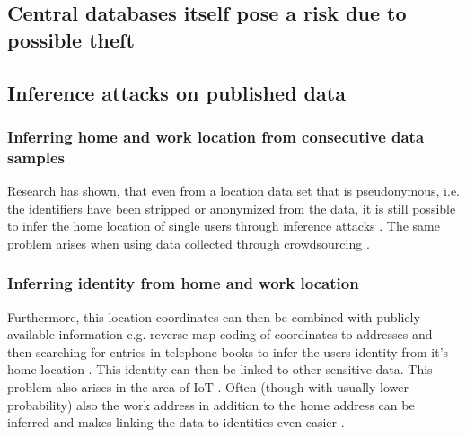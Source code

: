\subsection{Central databases itself pose a risk due to possible theft}


\subsection{Inference attacks on published data}

\subsubsection{Inferring home and work location from consecutive data samples}
Research has shown, that even from a location data set that is pseudonymous, i.e. the identifiers have been stripped or anonymized from the data, it is still possible to infer the home location of single users through inference attacks \parencite{krumm, cellphone, privacy-home-work-pairs, hoh2006enhancing, twitter}. The same problem arises when using data collected through crowdsourcing \parencite{crowdsourcing}.

\subsubsection{Inferring identity from home and work location}
Furthermore, this location coordinates can then be combined with publicly available information e.g. reverse map coding of coordinates to addresses and then searching for entries in telephone books to infer the users identity from it's home location \parencite{krumm, privacy-home-work-pairs, hoh2006enhancing}. This identity can then be linked to other sensitive data. This problem also arises in the area of IoT \parencite{iot, hoh2006enhancing}.
Often (though with usually lower probability) also the work address in addition to the home address can be inferred and makes linking the data to identities even easier \parencite{cellphone, privacy-home-work-pairs}.

